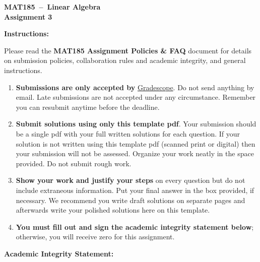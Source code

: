 \documentclass[10pt,answers]{exam}
\newcommand{\course}{MAT185}
\newcommand{\assignmenttitle}{Assignment 3}
\begin{document}
\vspace*{-0.5cm}
\begin{center}
  \large
  \textbf{\Large \course~--~Linear Algebra}\\[0.1cm]
  \textbf{\assignmenttitle}
\end{center}
\bigskip

\textbf{\large Instructions:}\\
\normalsize

Please read the {\bf MAT185 Assignment Policies \& FAQ} document for details on
submission policies, collaboration rules and academic integrity, and general
instructions.

\begin{enumerate}


\item \textbf{Submissions are only accepted by}
  \href{https://www.gradescope.ca}{Gradescope}. Do not send anything by email.
  Late submissions are not accepted under any circumstance. Remember you can
  resubmit anytime before the deadline.

\item \textbf{Submit solutions using only this template pdf}.  Your submission
  should be a single pdf with your full written solutions for each question. If
  your solution is not written using this template pdf (scanned print or
  digital) then your submission will not be assessed. Organize your work neatly
  in the space provided.  Do not submit rough work.

\item \textbf{Show your work and justify your steps} on every question but do
  not include extraneous information.  Put your final answer in the box
  provided, if necessary.  We recommend you write draft solutions on separate
  pages and afterwards write your polished solutions here on this template.

\item \textbf{You must fill out and sign the academic integrity statement
    below}; otherwise, you will receive zero for this assignment.

\end{enumerate}

\vspace{10pt}


\textbf{\large Academic Integrity Statement:} \\



\vspace*{0.1in}
\end{document}
